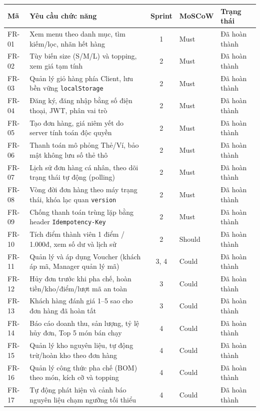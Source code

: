 \documentclass[12pt, a4paper]{article}
\begin{document}
\begin{table}[!htbp]\centering\scriptsize\setlength{\tabcolsep}{3pt}
\begin{tabularx}{\textwidth}{@{}l X c l l@{}}
\toprule \textbf{Mã} & \textbf{Yêu cầu chức năng} & \textbf{Sprint} & \textbf{MoSCoW} & \textbf{Trạng thái} \\ \midrule
FR-01 & Xem menu theo danh mục, tìm kiếm/lọc, nhãn hết hàng & 1 & Must & Đã hoàn thành \\
FR-02 & Tùy biến size (S/M/L) và topping, xem giá tạm tính & 2 & Must & Đã hoàn thành \\
FR-03 & Quản lý giỏ hàng phía Client, lưu bền vững \texttt{localStorage} & 2 & Must & Đã hoàn thành \\
FR-04 & Đăng ký, đăng nhập bằng số điện thoại, JWT, phân vai trò & 2 & Must & Đã hoàn thành \\
FR-05 & Tạo đơn hàng, giá niêm yết do server tính toán độc quyền & 2 & Must & Đã hoàn thành \\
FR-06 & Thanh toán mô phỏng Thẻ/Ví, bảo mật không lưu số thẻ thô & 2 & Must & Đã hoàn thành \\
FR-07 & Lịch sử đơn hàng cá nhân, theo dõi trạng thái tự động (polling) & 2 & Must & Đã hoàn thành \\
FR-08 & Vòng đời đơn hàng theo máy trạng thái, khóa lạc quan \texttt{version} & 2 & Must & Đã hoàn thành \\
FR-09 & Chống thanh toán trùng lặp bằng header \texttt{Idempotency-Key} & 2 & Must & Đã hoàn thành \\
FR-10 & Tích điểm thành viên 1 điểm / 1.000đ, xem số dư và lịch sử & 2 & Should & Đã hoàn thành \\
FR-11 & Quản lý và áp dụng Voucher (khách áp mã, Manager quản lý mã) & 3, 4 & Could & Đã hoàn thành \\
FR-12 & Hủy đơn trước khi pha chế, hoàn tiền/kho/điểm/lượt mã an toàn & 3 & Could & Đã hoàn thành \\
FR-13 & Khách hàng đánh giá 1--5 sao cho đơn hàng đã hoàn tất & 3 & Could & Đã hoàn thành \\
FR-14 & Báo cáo doanh thu, sản lượng, tỷ lệ hủy đơn, Top 5 món bán chạy & 4 & Could & Đã hoàn thành \\
FR-15 & Quản lý kho nguyên liệu, tự động trừ/hoàn kho theo đơn hàng & 4 & Could & Đã hoàn thành \\
FR-16 & Quản lý công thức pha chế (BOM) theo món, kích cỡ và topping & 4 & Could & Đã hoàn thành \\
FR-17 & Tự động phát hiện và cảnh báo nguyên liệu chạm ngưỡng tối thiểu & 4 & Could & Đã hoàn thành \\

\end{tabularx}
\end{table}
\end{document}

